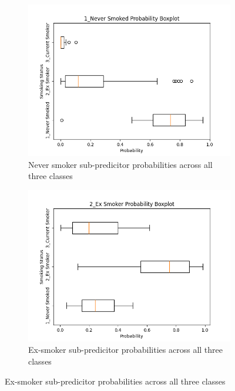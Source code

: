 \documentclass{article}
\begin{document}
\begin{figure}[H]
    \centering
    \begin{subfigure}{0.48\textwidth}
        \centering
        \includegraphics[width=\linewidth]{cohort1_1_boxplot.png}
        \caption{Never smoker sub-predicitor probabilities across all three classes}
    \end{subfigure}
    \hfill
    \begin{subfigure}{0.48\textwidth}
        \centering
        \includegraphics[width=\linewidth]{cohort1_2_boxplot.png}
        \caption{Ex-smoker sub-predicitor probabilities across all three classes}
    \end{subfigure}
    \par\vspace{0.5em}

\end{figure}
\end{document}
